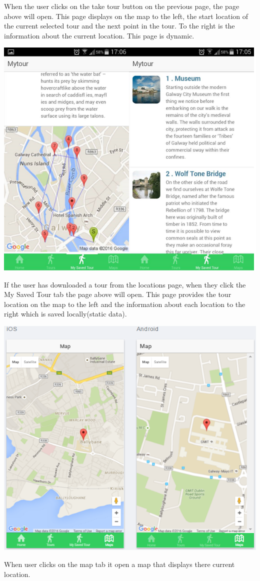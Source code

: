 		 				When  the user clicks on the take tour button on the previous page, the page above will open. This page displays on the map to the left, the start location of the current selected tour and the next point in the tour. To the right is the information about the current location. This page is dynamic.
		 				\begin{center}    
		 					 \includegraphics{img/MyTourTab.png}
		 				\end{center}
		 				If the user has downloaded a tour from the locations page, when they click the My Saved Tour tab the page above will open. This page provides the tour location on the map to the left and the information about each location to the right which is saved locally(static data).
		 				\begin{center}    
		 					\includegraphics{img/MapTab.png}
		 				\end{center}
		 				When user clicks on the map tab it open a map that displays there current location. 

